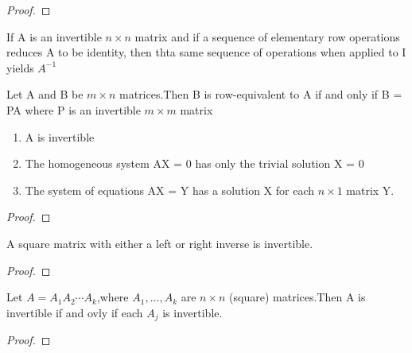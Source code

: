 \begin{proof}

\end{proof}


\begin{corollary}
	If A is an invertible $n \times n$ matrix and if a sequence of elementary row operations reduces A to be identity, then thta same sequence of operations when applied to I yields $A^{-1}$

\end{corollary}

\begin{corollary}
	Let A and B be $m \times n$ matrices.Then B is row-equivalent to A if and only if B = PA where P is an invertible $m \times m$ matrix
\end{corollary}

\begin{theorem}
	\begin{enumerate}
		\item A is invertible
		\item The homogeneous system AX = 0 has only the trivial solution X = 0
		\item The system of equations AX = Y has a solution X for each $n \times 1$ matrix Y.
	\end{enumerate}
\end{theorem}


\begin{proof}

\end{proof}


\begin{corollary}
	A square matrix with either a left or right inverse is invertible.
\end{corollary}

\begin{proof}

\end{proof}

\begin{corollary}
	Let $A = A_1A_2\cdots A_k$,where $A_1,\dots,A_k$ are $n \times n$ (square) matrices.Then A is invertible if and ovly if each $A_j$ is invertible.
\end{corollary}

\begin{proof}

\end{proof}



